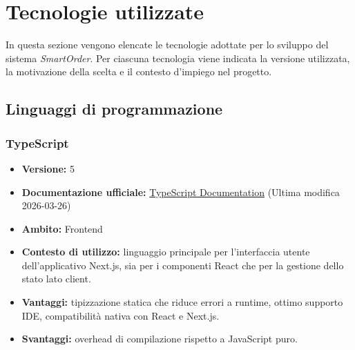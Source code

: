 \documentclass[a4paper, 11pt, oneside]{scrartcl}
\begin{document}
\newpage

\section{Tecnologie utilizzate}

In questa sezione vengono elencate le tecnologie adottate per lo sviluppo del sistema \textit{SmartOrder}. Per ciascuna tecnologia viene indicata la versione utilizzata, la motivazione della scelta e il contesto d'impiego nel progetto.

\subsection{Linguaggi di programmazione}

\subsubsection{TypeScript}
\begin{itemize}[noitemsep]
\item \textbf{Versione:} 5
\item \textbf{Documentazione ufficiale:} \href{https://www.typescriptlang.org/docs/}{TypeScript
 Documentation} (Ultima modifica 2026-03-26)
\item \textbf{Ambito:} Frontend
\item \textbf{Contesto di utilizzo:} linguaggio principale per l'interfaccia utente dell'applicativo Next.js, sia per i componenti React che per la gestione dello stato lato client.
\item \textbf{Vantaggi:} tipizzazione statica che riduce errori a runtime, ottimo supporto IDE, compatibilit\`a nativa con React e Next.js.
\item \textbf{Svantaggi:} overhead di compilazione rispetto a JavaScript puro.
\end{itemize}
\end{document}
